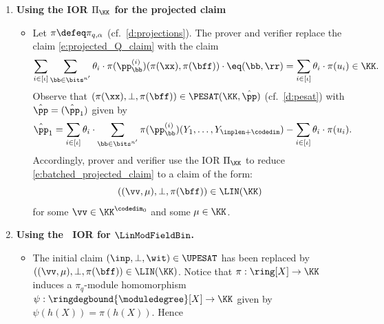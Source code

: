 \begin{construction}
\begin{enumerate}[leftmargin=*]
\begin{itemize}[leftmargin=*]
These values can be computed as one would compute the corresponding values in a univariate skip, see \cref{s:univ_skip_ideal_membership} . Alternatively, if $Q^{(i)}$ is linear on the multilinear extension of $\bff$, then  $u_i$ can easily be computed from $\mle{\pi_q(\bff)}(\rr)$, which in turn can be computed as $\moduledegree$ MLE evaluations over $\pi_q(\ring)$\footnote{This was already observed at least in \cite{flock}, when $Q^{(i)}$ is the multilinear extension of the vector $C\cdot \zz$ in an R1CS constraint .}.
\item The verifier checks that $u_i \in (\pi_q(h_i))$ for all $i\in [\iota]$. Then it samples and sends batching elements $\theta_1, \ldots, \theta_\iota\in \KK$. Further, if $\moduledegree>0$, it samples and sends an element $\alpha$ . 
\end{itemize}
\item \textbf{Using the IOR $\Pi_\KK$ for the projected claim}
\begin{itemize}[leftmargin=*]
\item Let $\pi\defeq \pi_{q,\alpha}$ (cf.\ \cref{d:projections}). The prover and verifier replace the claim \eqref{e:projected_Q_claim} with the claim 
%
\begin{equation}\label{e:batched_projected_claim}
\sum_{i\in [\iota]}\sum_{\bb\in \bits^{n'}}\theta_i\cdot \pi(\pp_\bb^{(i)})(\pi(\xx),\pi(\bff)) \cdot \eq(\bb, \rr) = \sum_{i\in [\iota]} \theta_i \cdot \pi(u_i) \in \KK.
\end{equation}
%
Observe that $(\pi(\xx),\bot, \pi(\bff))\in \PESAT(\KK,\hat{\pp})$ (cf.\ \cref{d:pesat})
with $\hat{\pp}=(\hat{\pp}_1)$ given by $$\hat{\pp}_1=\sum_{i\in[\iota]}\theta_i\cdot\sum_{\bb\in \bits^{n'}}\pi(\pp_{\bb}^{(i)})(Y_1, \ldots, Y_{\inplen+\codedim})-\sum_{i\in [\iota]} \theta_i\cdot \pi(u_i).$$ 
%
Accordingly, prover and verifier use the IOR $\Pi_{\KK}$  to reduce \eqref{e:batched_projected_claim} to 
 a claim of the form:
\begin{equation}\label{e:iop_linear_claim_raw}
((\vv,\mu), \bot, \pi(\bff))\in \LIN(\KK)
\end{equation}
%
for some $\vv \in \KK^{ \codedim_0}$  and some $\mu\in \KK$.
\end{itemize}
\item \textbf{Using the \ftwoz \ IOR for $\LinModFieldBin$.}
\begin{itemize}[leftmargin=*]
\item The initial claim $(\inp,\bot,\wit)\in \UPESAT$ has been replaced by $((\vv,\mu),\bot,\pi(\bff))\in \LIN(\KK)$.  Notice that $\pi:\ring[X] \to \KK$ induces a $\pi_q$-module homomorphism $\psi:\ringdegbound{\moduledegree}[X] \to \KK$ given by $\psi(h(X)) = \pi(h(X))$. Hence

\end{itemize}
\end{enumerate}
\end{construction}
